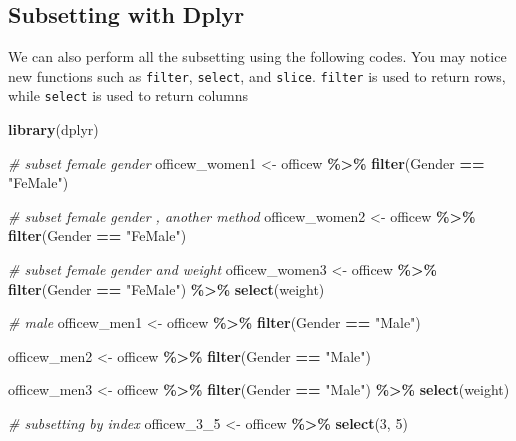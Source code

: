 \documentclass[
]{article}
\newenvironment{Shaded}{\begin{snugshade}}{\end{snugshade}}
\newcommand{\CommentTok}[1]{\textcolor[rgb]{0.56,0.35,0.01}{\textit{#1}}}
\newcommand{\DecValTok}[1]{\textcolor[rgb]{0.00,0.00,0.81}{#1}}
\newcommand{\FunctionTok}[1]{\textcolor[rgb]{0.13,0.29,0.53}{\textbf{#1}}}
\newcommand{\NormalTok}[1]{#1}
\newcommand{\OtherTok}[1]{\textcolor[rgb]{0.56,0.35,0.01}{#1}}
\newcommand{\SpecialCharTok}[1]{\textcolor[rgb]{0.81,0.36,0.00}{\textbf{#1}}}
\newcommand{\StringTok}[1]{\textcolor[rgb]{0.31,0.60,0.02}{#1}}
\begin{document}
\hypertarget{subsetting-with-dplyr}{%
\subsection{Subsetting with Dplyr}\label{subsetting-with-dplyr}}

We can also perform all the subsetting using the following codes. You
may notice new functions such as \texttt{filter}, \texttt{select}, and
\texttt{slice}. \texttt{filter} is used to return rows, while
\texttt{select} is used to return columns

\begin{Shaded}
\begin{Highlighting}[]
\FunctionTok{library}\NormalTok{(dplyr)}

\CommentTok{\# subset female gender}
\NormalTok{officew\_women1 }\OtherTok{\textless{}{-}}\NormalTok{ officew }\SpecialCharTok{\%\textgreater{}\%}
  \FunctionTok{filter}\NormalTok{(Gender }\SpecialCharTok{==} \StringTok{"FeMale"}\NormalTok{) }

\CommentTok{\# subset female gender , another method}
\NormalTok{officew\_women2 }\OtherTok{\textless{}{-}}\NormalTok{ officew }\SpecialCharTok{\%\textgreater{}\%}
  \FunctionTok{filter}\NormalTok{(Gender }\SpecialCharTok{==} \StringTok{"FeMale"}\NormalTok{)}

\CommentTok{\# subset female gender and weight}
\NormalTok{officew\_women3 }\OtherTok{\textless{}{-}}\NormalTok{ officew }\SpecialCharTok{\%\textgreater{}\%}
  \FunctionTok{filter}\NormalTok{(Gender }\SpecialCharTok{==} \StringTok{"FeMale"}\NormalTok{) }\SpecialCharTok{\%\textgreater{}\%}
  \FunctionTok{select}\NormalTok{(weight)}

\CommentTok{\# male}
\NormalTok{officew\_men1 }\OtherTok{\textless{}{-}}\NormalTok{ officew }\SpecialCharTok{\%\textgreater{}\%}
  \FunctionTok{filter}\NormalTok{(Gender }\SpecialCharTok{==} \StringTok{"Male"}\NormalTok{)}

\NormalTok{officew\_men2 }\OtherTok{\textless{}{-}}\NormalTok{ officew }\SpecialCharTok{\%\textgreater{}\%}
  \FunctionTok{filter}\NormalTok{(Gender }\SpecialCharTok{==} \StringTok{"Male"}\NormalTok{)}

\NormalTok{officew\_men3 }\OtherTok{\textless{}{-}}\NormalTok{ officew }\SpecialCharTok{\%\textgreater{}\%}
  \FunctionTok{filter}\NormalTok{(Gender }\SpecialCharTok{==} \StringTok{"Male"}\NormalTok{) }\SpecialCharTok{\%\textgreater{}\%}
  \FunctionTok{select}\NormalTok{(weight)}

\CommentTok{\# subsetting by index}
\NormalTok{officew\_3\_5 }\OtherTok{\textless{}{-}}\NormalTok{ officew }\SpecialCharTok{\%\textgreater{}\%}
  \FunctionTok{select}\NormalTok{(}\DecValTok{3}\NormalTok{, }\DecValTok{5}\NormalTok{)}


\end{Highlighting}
\end{Shaded}
\end{document}
